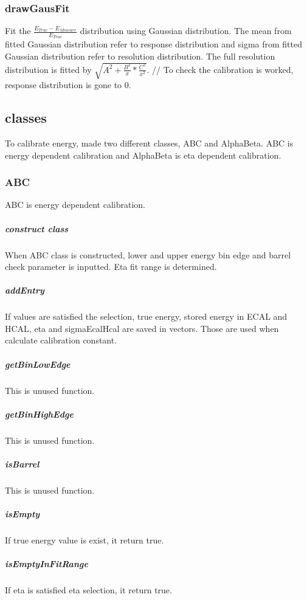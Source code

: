 \documentclass{cernrep}
\begin{document}
\subsubsection {drawGausFit}

Fit the $\frac{E_{True}-E_{Measure}}{E_{True}}$ distribution  using Gaussian distribution. The mean from fitted Gaussian distribution refer to response distribution and sigma from  fitted Gaussian distribution refer to resolution distribution. The full resolution distribution is fitted by $\sqrt{A^2+\frac{B^2}{x}*\frac{C^2}{x^2}}$. //
To check the calibration is worked, response distribution is gone to 0.

\subsection{classes}

To calibrate energy, made two different classes, ABC and AlphaBeta. ABC is energy dependent calibration and AlphaBeta is eta dependent calibration.

\subsubsection{ABC}

ABC is energy dependent calibration.

\subparagraph{construct class}

When ABC class is constructed, lower and upper energy bin edge and barrel check parameter is inputted. Eta fit range is determined.

\subparagraph{addEntry}

If values are satisfied the selection, true energy, stored energy in ECAL and HCAL, eta and sigmaEcalHcal are saved in vectors. Those are used when calculate calibration constant.

\subparagraph{getBinLowEdge}

This is unused function.

\subparagraph{getBinHighEdge}

This is unused function.

\subparagraph{isBarrel}

This is unused function.

\subparagraph{isEmpty}

If true energy value is exist, it return true.

\subparagraph{isEmptyInFitRange}

If eta is satisfied eta selection, it return true.
\end{document}
